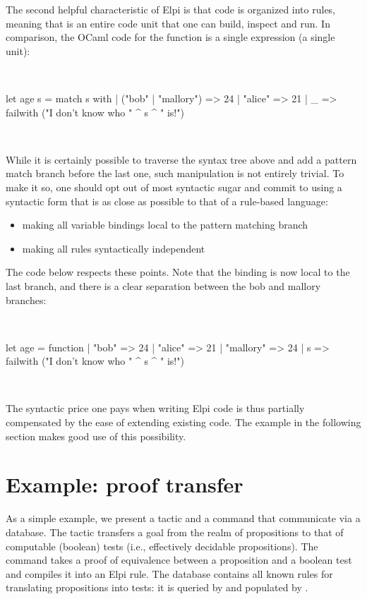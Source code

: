 \documentclass[a4paper, 11pt]{book}
\newenvironment{ocamlcode}
  {\VerbatimEnvironment~\\\begin{ocamlbox}\begin{xocamlcode}}{\end{xocamlcode}
\end{ocamlbox}\\}
\begin{document}
The second helpful characteristic of Elpi is that code is organized into rules,
meaning that  is an entire code unit that one can build,
inspect and run. In comparison, the OCaml code for the  function is a
single expression (a single unit):

\begin{ocamlcode}
let age s =
  match s with
  | ("bob" | "mallory") => 24
  | "alice" => 21
  | _ => failwith ("I don't know who " ^ s ^ " is!")
\end{ocamlcode}


While it is certainly possible to traverse the syntax tree above and add a
pattern match branch before the last one, such manipulation is not entirely
trivial. To make it so, one should opt out of most syntactic sugar and commit
to using a syntactic form that is as close as possible to that of a rule-based
language:
\begin{itemize}
  \item making all variable bindings local to the pattern matching branch
  \item making all rules syntactically independent
\end{itemize}


The code below respects these points. Note that the  binding is now
local to the last branch, and there is a clear separation between the bob and
mallory branches:

\begin{ocamlcode}
let age = function
  | "bob" => 24
  | "alice" => 21
  | "mallory" => 24
  | s => failwith ("I don't know who " ^ s ^ " is!")
\end{ocamlcode}
  

The syntactic price one pays when writing Elpi code is thus partially
compensated by the ease of extending existing code. The example in the
following section makes good use of this possibility.

\section{Example: proof transfer}\label{sec:tb}


As a simple example, we present a tactic and a command that communicate via a
database. The tactic  transfers a goal from the realm of
propositions to that of computable (boolean) tests (i.e., effectively decidable
propositions). The command  takes a proof of
equivalence between a proposition and a boolean test and compiles it into an
Elpi rule. The database contains all known rules for translating propositions
into tests: it is queried by  and populated by
.
\end{document}
